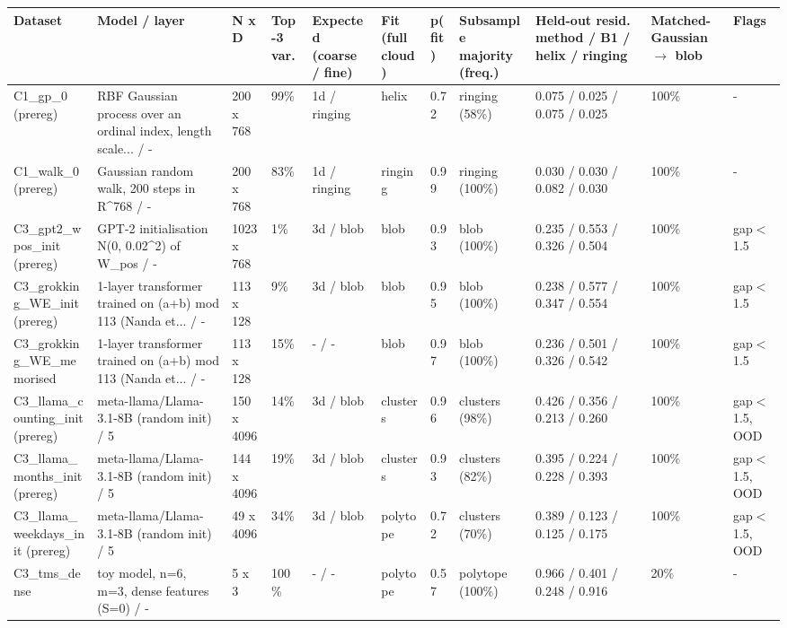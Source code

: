 \scriptsize
\begin{tabular}{lllllllllll}
\toprule
\textbf{Dataset} & \textbf{Model / layer} & \textbf{N x D} & \textbf{Top-3 var.} & \textbf{Expected (coarse / fine)} & \textbf{Fit (full cloud)} & \textbf{p(fit)} & \textbf{Subsample majority (freq.)} & \textbf{Held-out resid. method / B1 / helix / ringing} & \textbf{Matched-Gaussian $\to$ blob} & \textbf{Flags} \\
\midrule
C1\_gp\_0 (prereg) & RBF Gaussian process over an ordinal index, length scale... / - & 200 x 768 & 99\% & 1d / ringing & helix & 0.72 & ringing (58\%) & 0.075 / 0.025 / 0.075 / 0.025 & 100\% & - \\
C1\_walk\_0 (prereg) & Gaussian random walk, 200 steps in R\textasciicircum{}768 / - & 200 x 768 & 83\% & 1d / ringing & ringing & 0.99 & ringing (100\%) & 0.030 / 0.030 / 0.082 / 0.030 & 100\% & - \\
C3\_gpt2\_wpos\_init (prereg) & GPT-2 initialisation N(0, 0.02\textasciicircum{}2) of W\_pos / - & 1023 x 768 & 1\% & 3d / blob & blob & 0.93 & blob (100\%) & 0.235 / 0.553 / 0.326 / 0.504 & 100\% & gap$<$1.5 \\
C3\_grokking\_WE\_init (prereg) & 1-layer transformer trained on (a+b) mod 113 (Nanda et... / - & 113 x 128 & 9\% & 3d / blob & blob & 0.95 & blob (100\%) & 0.238 / 0.577 / 0.347 / 0.554 & 100\% & gap$<$1.5 \\
C3\_grokking\_WE\_memorised & 1-layer transformer trained on (a+b) mod 113 (Nanda et... / - & 113 x 128 & 15\% & - / - & blob & 0.97 & blob (100\%) & 0.236 / 0.501 / 0.326 / 0.542 & 100\% & gap$<$1.5 \\
C3\_llama\_counting\_init (prereg) & meta-llama/Llama-3.1-8B (random init) / 5 & 150 x 4096 & 14\% & 3d / blob & clusters & 0.96 & clusters (98\%) & 0.426 / 0.356 / 0.213 / 0.260 & 100\% & gap$<$1.5, OOD \\
C3\_llama\_months\_init (prereg) & meta-llama/Llama-3.1-8B (random init) / 5 & 144 x 4096 & 19\% & 3d / blob & clusters & 0.93 & clusters (82\%) & 0.395 / 0.224 / 0.228 / 0.393 & 100\% & gap$<$1.5, OOD \\
C3\_llama\_weekdays\_init (prereg) & meta-llama/Llama-3.1-8B (random init) / 5 & 49 x 4096 & 34\% & 3d / blob & polytope & 0.72 & clusters (70\%) & 0.389 / 0.123 / 0.125 / 0.175 & 100\% & gap$<$1.5, OOD \\
C3\_tms\_dense & toy model, n=6, m=3, dense features (S=0) / - & 5 x 3 & 100\% & - / - & polytope & 0.57 & polytope (100\%) & 0.966 / 0.401 / 0.248 / 0.916 & 20\% & - \\

\end{tabular}
